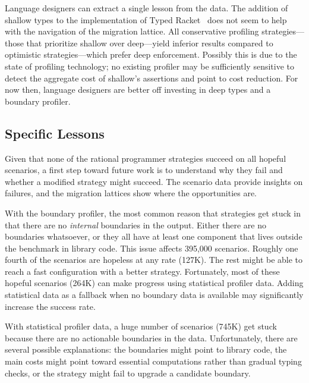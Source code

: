 Language designers can extract a single lesson from the data.  The addition of
shallow types to the implementation of Typed Racket~\cite{g-deep-shallow} does
not seem to help with the navigation of the migration lattice. All conservative
profiling strategies---those that prioritize shallow over deep---yield inferior
results compared to optimistic strategies---which prefer deep
enforcement. Possibly this is due to the state of profiling technology; no
existing profiler may be sufficiently sensitive to detect the aggregate cost of
shallow's assertions and point to cost reduction.  For now then, language
designers are better off investing in deep types and a boundary profiler.




\subsection{Specific Lessons}
\label{s:specific-lessons}

Given that none of the rational programmer strategies
succeed on all hopeful scenarios, a first step toward
future work is to understand why they fail and whether
a modified strategy might succeed.
The scenario data provide insights on failures,
and the migration lattices show where the opportunities are.

With the boundary profiler, the most common reason
that strategies get stuck in that there are no
\emph{internal} boundaries in the output.
Either there are no boundaries whatsoever, or they all have at least one
component that lives outside the benchmark in library code.
This issue affects 395,000 scenarios.
Roughly one fourth of the scenarios are hopeless at any rate (127K).
The rest might be able to reach a fast configuration with a better strategy.
Fortunately, most of these hopeful scenarios (264K) can make progress
using statistical profiler data.
Adding statistical data as a fallback when no boundary data is available
may significantly increase the success rate.

With statistical profiler data, a huge number of scenarios (745K) get stuck
because there are no actionable boundaries in the data.
Unfortunately, there are several possible explanations:
the boundaries might point to library code, the main costs might point toward
essential computations rather than gradual typing checks, or the strategy
might fail to upgrade a candidate boundary.

